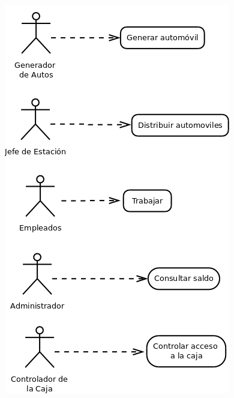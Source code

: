 \documentclass[12pt,a4paper,spanish]{article}
\begin{document}
	\begin{figure}[h]
	\includegraphics[scale=0.50]{casos_de_uso.png}
	\centering
	\end{figure}
\end{document}
